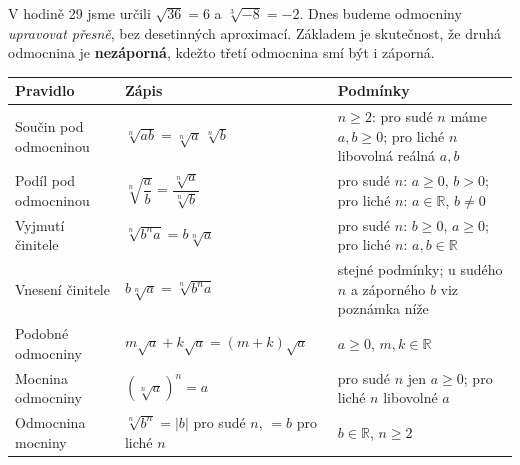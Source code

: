 \documentclass[11pt,a4paper]{article}
\begin{document}

V hodině 29 jsme určili $\sqrt{36}=6$ a $\sqrt[3]{-8}=-2$.
Dnes budeme odmocniny \emph{upravovat přesně}, bez desetinných aproximací.
Základem je skutečnost, že druhá odmocnina je \textbf{nezáporná},
kdežto třetí odmocnina smí být i záporná.

\begin{center}\small
\begin{tabularx}{\linewidth}{@{}>{\raggedright\arraybackslash}p{35mm}>{\raggedright\arraybackslash}p{58mm}X@{}}
\toprule
\textbf{Pravidlo} & \textbf{Zápis} & \textbf{Podmínky} \\ \midrule
Součin pod odmocninou & $\sqrt[n]{ab}=\sqrt[n]a\,\sqrt[n]b$ & $n\ge2$: pro sudé $n$ máme $a,b\ge0$; pro liché $n$ libovolná reálná $a,b$ \\
Podíl pod odmocninou & $\sqrt[n]{\dfrac ab}=\dfrac{\sqrt[n]a}{\sqrt[n]b}$ & pro sudé $n$: $a\ge0$, $b>0$; pro liché $n$: $a\in\mathbb R$, $b\ne0$ \\
Vyjmutí činitele & $\sqrt[n]{b^n a}=b\sqrt[n]a$ & pro sudé $n$: $b\ge0$, $a\ge0$; pro liché $n$: $a,b\in\mathbb R$ \\
Vnesení činitele & $b\sqrt[n]a=\sqrt[n]{b^n a}$ & stejné podmínky; u sudého $n$ a záporného $b$ viz poznámka níže \\
Podobné odmocniny & $m\sqrt a+k\sqrt a=(m+k)\sqrt a$ & $a\ge0$, $m,k\in\mathbb R$ \\
Mocnina odmocniny & $(\sqrt[n]a)^n=a$ & pro sudé $n$ jen $a\ge0$; pro liché $n$ libovolné $a$ \\
Odmocnina mocniny & $\sqrt[n]{b^n}=|b|$ pro sudé $n$, $=b$ pro liché $n$ & $b\in\mathbb R$, $n\ge2$ \\
\bottomrule
\end{tabularx}\normalsize\end{center}
\end{document}
